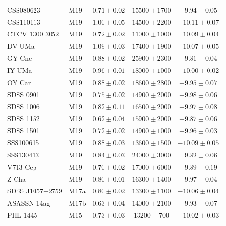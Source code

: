 \begin{table}
\begin{tabular}{llccc}
        CSS080623        &  M19  & $0.71 \pm 0.02$ & $15500\pm  1700$ & $ -9.94 \pm 0.05$ \\
        CSS110113        &  M19  & $1.00 \pm 0.05$ & $14500\pm  2200$ & $-10.11 \pm 0.07$ \\
        CTCV 1300-3052   &  M19  & $0.72 \pm 0.02$ & $11000\pm  1000$ & $-10.09 \pm 0.04$ \\
        DV UMa           &  M19  & $1.09 \pm 0.03$ & $17400\pm  1900$ & $-10.07 \pm 0.05$ \\
        GY Cnc           &  M19  & $0.88 \pm 0.02$ & $25900\pm  2300$ & $ -9.81 \pm 0.04$ \\
        IY UMa           &  M19  & $0.96 \pm 0.01$ & $18000\pm  1000$ & $-10.00 \pm 0.02$ \\
        OY Car           &  M19  & $0.88 \pm 0.02$ & $18600\pm  2800$ & $ -9.95 \pm 0.07$ \\
        SDSS 0901        &  M19  & $0.75 \pm 0.02$ & $14900\pm  2000$ & $ -9.98 \pm 0.06$ \\
        SDSS 1006        &  M19  & $0.82 \pm 0.11$ & $16500\pm  2000$ & $ -9.97 \pm 0.08$ \\
        SDSS 1152        &  M19  & $0.62 \pm 0.04$ & $15900\pm  2000$ & $ -9.87 \pm 0.06$ \\
        SDSS 1501        &  M19  & $0.72 \pm 0.02$ & $14900\pm  1000$ & $ -9.96 \pm 0.03$ \\
        SSS100615        &  M19  & $0.88 \pm 0.03$ & $13600\pm  1500$ & $-10.09 \pm 0.05$ \\
        SSS130413        &  M19  & $0.84 \pm 0.03$ & $24000\pm  3000$ & $ -9.82 \pm 0.06$ \\
        V713 Cep         &  M19  & $0.70 \pm 0.02$ & $17000\pm  6000$ & $ -9.89 \pm 0.19$ \\
        Z Cha            &  M19  & $0.80 \pm 0.01$ & $16300\pm  1400$ & $ -9.97 \pm 0.04$ \\
        SDSS J1057+2759  &  M17a & $0.80 \pm 0.02$ & $13300\pm  1100$ & $-10.06 \pm 0.04$ \\
        ASASSN-14ag      &  M17b & $0.63 \pm 0.04$ & $14000\pm  2100$ & $ -9.93 \pm 0.07$ \\
        PHL 1445         &  M15  & $0.73 \pm 0.03$ & $13200\pm   700$ & $-10.02 \pm 0.03$ \\
        \hline
    \end{tabular}
\end{table}

